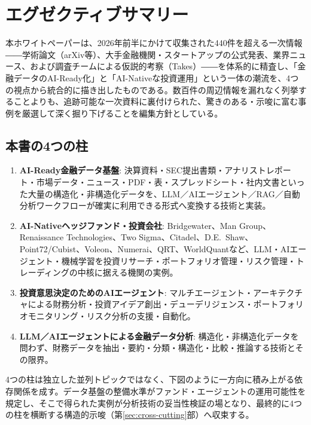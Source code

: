 \section{エグゼクティブサマリー}
\label{sec:exec-summary}

本ホワイトペーパーは、2026年前半にかけて収集された440件を超える一次情報――学術論文（arXiv等）、大手金融機関・スタートアップの公式発表、業界ニュース、および調査チームによる仮説的考察（Takes）――を体系的に精査し、「金融データのAI-Ready化」と「AI-Nativeな投資運用」という一体の潮流を、4つの視点から統合的に描き出したものである。数百件の周辺情報を漏れなく列挙することよりも、追跡可能な一次資料に裏付けられた、驚きのある・示唆に富む事例を厳選して深く掘り下げることを編集方針としている。

\subsection*{本書の4つの柱}

\begin{enumerate}
  \item \textbf{AI-Ready金融データ基盤}: 決算資料・SEC提出書類・アナリストレポート・市場データ・ニュース・PDF・表・スプレッドシート・社内文書といった大量の構造化・非構造化データを、LLM／AIエージェント／RAG／自動分析ワークフローが確実に利用できる形式へ変換する技術と実装。
  \item \textbf{AI-Nativeヘッジファンド・投資会社}: Bridgewater、Man Group、Renaissance Technologies、Two Sigma、Citadel、D.E.\ Shaw、Point72/Cubist、Voleon、Numerai、QRT、WorldQuantなど、LLM・AIエージェント・機械学習を投資リサーチ・ポートフォリオ管理・リスク管理・トレーディングの中核に据える機関の実例。
  \item \textbf{投資意思決定のためのAIエージェント}: マルチエージェント・アーキテクチャによる財務分析・投資アイデア創出・デューデリジェンス・ポートフォリオモニタリング・リスク分析の支援・自動化。
  \item \textbf{LLM／AIエージェントによる金融データ分析}: 構造化・非構造化データを問わず、財務データを抽出・要約・分類・構造化・比較・推論する技術とその限界。
\end{enumerate}

4つの柱は独立した並列トピックではなく、下図のように一方向に積み上がる依存関係を成す。データ基盤の整備水準がファンド・エージェントの運用可能性を規定し、そこで得られた実例が分析技術の妥当性検証の場となり、最終的に4つの柱を横断する構造的示唆（第\ref{sec:cross-cutting}部）へ収束する。

